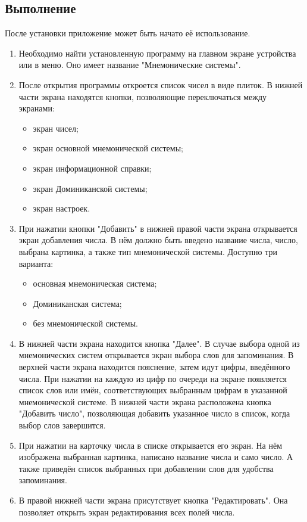 \documentclass[draft]{article}
\begin{document}
\subsection{Выполнение}
После установки приложение может быть начато её использование. 
\begin{enumerate}
\item Необходимо найти установленную программу на главном экране устройства или в меню. Оно имеет название "Мнемонические системы".
\item После открытия программы откроется список чисел в виде плиток. В нижней части экрана находятся кнопки, позволяющие переключаться между экранами:
\begin{itemize}
\item экран чисел;
\item экран основной мнемонической системы;
\item экран информационной справки;
\item экран Доминиканской системы;
\item экран настроек.
\end{itemize}
\item При нажатии кнопки "{}Добавить"{} в нижней правой части экрана открывается экран добавления числа. В нём должно быть введено название числа, число, выбрана картинка, а также тип мнемонической системы. Доступно три варианта:
\begin{itemize}
\item основная мнемоническая система;
\item Доминиканская система;
\item без мнемонической системы.
\end{itemize}
\item В нижней части экрана находится кнопка "{}Далее"{}. В случае выбора одной из мнемонических систем открывается экран выбора слов для запоминания. В верхней части экрана находится пояснение, затем идут цифры, введённого числа. При нажатии на каждую из цифр по очереди на экране появляется список слов или имён, соответствующих выбранным цифрам в указанной мнемонической системе. В нижней части экрана расположена кнопка "{}Добавить число"{}, позволяющая добавить указанное число в список, когда выбор слов завершится.
\item При нажатии на карточку числа в списке открывается его экран. На нём изображена выбранная картинка, написано название числа и само число. А также приведён список выбранных при добавлении слов для удобства запоминания.
\item В правой нижней части экрана присутствует кнопка "{}Редактировать"{}. Она позволяет открыть экран редактирования всех полей числа.

\end{enumerate}
\end{document}
